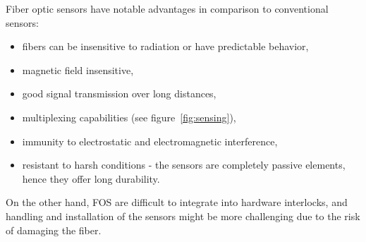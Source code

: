 Fiber optic sensors have notable advantages in comparison to conventional sensors:

\begin{itemize}
    \item fibers can be insensitive to radiation or have predictable behavior,
    \item magnetic field insensitive,
    \item good signal transmission over long distances,
    \item multiplexing capabilities (see figure~\ref{fig:sensing}),
    \item immunity to electrostatic and electromagnetic interference,
    \item resistant to harsh conditions - the sensors are completely passive elements, hence they offer long durability.
\end{itemize}
On the other hand, \gls{FOS} are difficult to integrate into hardware interlocks, and handling and installation of the sensors might be more challenging due to the risk of damaging the fiber.




